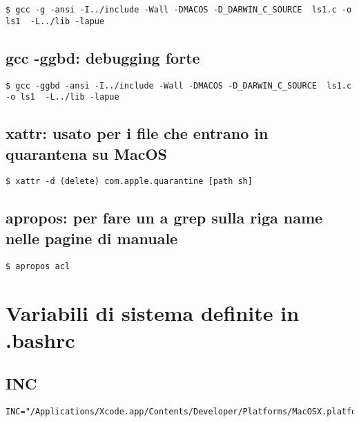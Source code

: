 \begin{lstlisting}
$ gcc -g -ansi -I../include -Wall -DMACOS -D_DARWIN_C_SOURCE  ls1.c -o ls1  -L../lib -lapue
\end{lstlisting}


\subsection{gcc -ggbd: debugging forte}

\begin{lstlisting}
$ gcc -ggbd -ansi -I../include -Wall -DMACOS -D_DARWIN_C_SOURCE  ls1.c -o ls1  -L../lib -lapue
\end{lstlisting}


\subsection{xattr: usato per i file che entrano in quarantena su MacOS}

\begin{lstlisting}
$ xattr -d (delete) com.apple.quarantine [path sh]
\end{lstlisting}


\subsection{apropos: per fare un a grep sulla riga name nelle pagine di manuale}

\begin{lstlisting}
$ apropos acl
\end{lstlisting}



\section{Variabili di sistema definite in .bashrc}

\subsection{INC}

\begin{lstlisting}
INC="/Applications/Xcode.app/Contents/Developer/Platforms/MacOSX.platform/Developer/SDKs/MacOSX.sdk/usr/include/"
\end{lstlisting}

